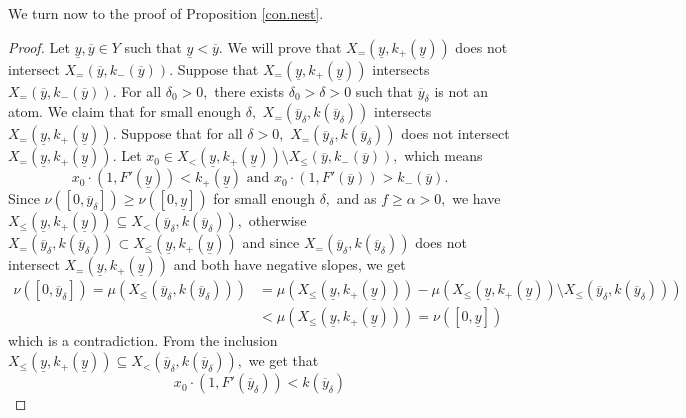 \documentclass[12pt,reqno]{amsart}
\begin{document}
We turn now to the proof of Proposition \ref{con.nest}.
\begin{proof}
    Let $\underline{y},\overline{y}\in Y$ such that $\underline{y}<\overline{y}$. We will prove that $X_=(\underline{y},k_+(\underline{y}))$ does not intersect $X_=(\overline{y},k_-(\overline{y})).$   Suppose that $X_=(\underline{y},k_+(\underline{y}))$ intersects $X_=(\overline{y},k_-(\overline{y})).$ For all $\delta_0>0,$ there exists $\delta_0>\delta>0$ such that $\overline{y}_\delta$ is not an atom.  We claim that for small enough $\delta,$  $X_=(\overline{y}_\delta,k(\overline{y}_\delta))$ intersects $X_=(\underline{y},k_+(\underline{y})).$ Suppose that for all $\delta>0,$ $X_=(\overline{y}_\delta,k(\overline{y}_\delta))$ does not intersect $X_=(\underline{y},k_+(\underline{y})).$ Let $x_0\in X_<(\underline{y},k_+(\underline{y}))\setminus X_\le(\overline{y},k_-(\overline{y})),$ which means 
    \begin{equation}\label{delta}
    x_0\cdot(1,F'(\underline{y}))<k_+(\underline{y}) \text{ and } x_0\cdot(1,F'(\overline{y}))>k_-(\overline{y}).
    \end{equation} Since $\nu([0,\overline{y}_\delta])\ge\nu([0,\underline{y}])$ for small enough $\delta,$ and as $f\ge\alpha>0,$ we have $X_\le(\underline{y},k_+(\underline{y}))\subseteq X_<(\overline{y}_\delta,k(\overline{y}_\delta)),$ otherwise $X_=(\overline{y}_\delta,k(\overline{y}_\delta))\subset X_\le(\underline{y},k_+(\underline{y}))$ and since $X_=(\overline{y}_\delta,k(\overline{y}_\delta))$ does not intersect $X_=(\underline{y},k_+(\underline{y}))$ and both have negative slopes, we get
    \[\begin{array}{ll}\nu([0,\overline{y}_\delta])=\mu(X_\le(\overline{y}_\delta,k(\overline{y}_\delta)))&=\mu(X_\le(\underline{y},k_+(\underline{y})))-\mu(X_\le(\underline{y},k_+(\underline{y}))\setminus X_\le(\overline{y}_\delta,k(\overline{y}_\delta)) )\\
    &<\mu(X_\le(\underline{y},k_+(\underline{y})))=\nu([0,\underline{y}])
    \end{array}\] which is a contradiction. From the inclusion $X_\le(\underline{y},k_+(\underline{y}))\subseteq X_<(\overline{y}_\delta,k(\overline{y}_\delta)),$ we get that 
    \begin{equation}\label{deltaineq}x_0\cdot (1,F'(\overline{y}_\delta))< k(\overline{y}_\delta)

\end{equation}
\end{proof}
\end{document}
